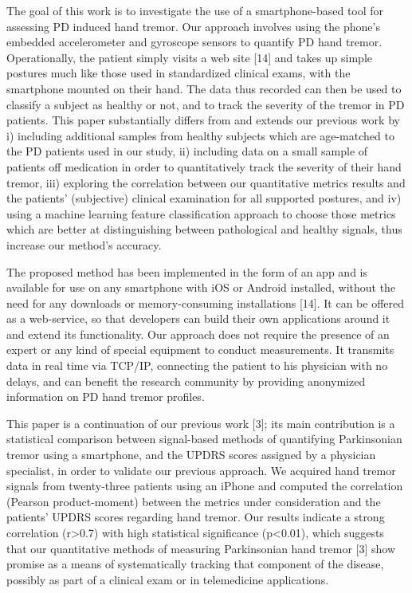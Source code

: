 The goal of this work is to investigate the use of a smartphone-based tool for assessing PD induced hand tremor. Our approach involves using the phone’s embedded accelerometer and gyroscope sensors to quantify PD hand tremor. Operationally, the patient simply visits a web site [14] and takes up simple postures much like those used in standardized clinical exams, with the smartphone mounted on their hand. The data thus recorded can then be used to classify a subject as healthy or not, and to track the severity of the tremor in PD patients. 
This paper substantially differs from and extends our previous work by 
i) including additional samples from healthy subjects which are age-matched to the PD patients used in our study, 
ii) including data on a small sample of patients off medication in order to quantitatively track the severity of their hand tremor, 
iii) exploring the correlation between our quantitative metrics results and the patients’ (subjective) clinical examination for all supported postures, and 
iv) using a machine learning feature classification approach to choose those metrics which are better at distinguishing between pathological and healthy signals, thus  increase our method’s accuracy. 

The proposed method has been implemented in the form of an app and is available for use on any smartphone with iOS or Android installed, without the need for any downloads or memory-consuming installations [14]. It can be offered as a web-service, so that developers can build their own applications around it and extend its functionality. Our approach does not require the presence of an expert or any kind of special equipment to conduct measurements. It transmits data in real time via TCP/IP, connecting the patient to his physician with no delays, and can benefit the research community by providing anonymized information on PD hand tremor profiles. 



This paper is a continuation of our previous work [3]; its main contribution is a statistical comparison between signal-based methods of quantifying Parkinsonian tremor using a smartphone, and the UPDRS scores assigned by a physician specialist, in order to validate our previous approach. We acquired hand tremor signals from twenty-three patients using an iPhone and computed the correlation (Pearson product-moment) between the metrics under consideration and the patients’ UPDRS scores regarding hand tremor. Our results indicate a strong correlation (r>0.7) with high statistical significance (p<0.01), which suggests that our quantitative methods of measuring Parkinsonian hand tremor [3] show promise as a means of systematically tracking that component of the disease, possibly as part of a clinical exam or in telemedicine applications. 

